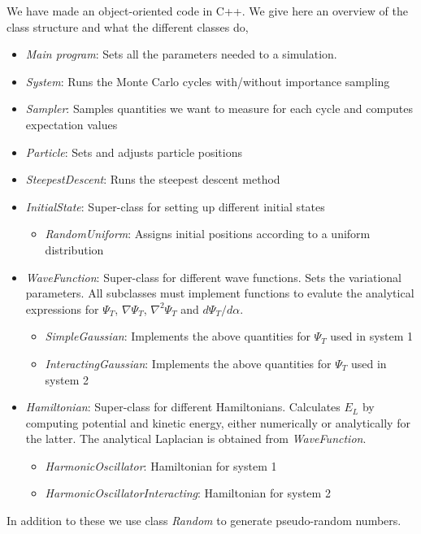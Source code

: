 \documentclass[english, a4paper]{article}
\begin{document}
We have made an object-oriented code in C++. We give here 
an overview of the class structure and what the different classes do,
\begin{itemize}
 \item \textit{Main program}: Sets all the parameters needed to a simulation. 
 \item \textit{System}: Runs the Monte Carlo cycles with/without importance sampling
 \item \textit{Sampler}: Samples quantities we want to measure for each cycle and computes expectation values
 \item \textit{Particle}: Sets and adjusts particle positions
 \item \textit{SteepestDescent}: Runs the steepest descent method
 \item \textit{InitialState}: Super-class for setting up different initial states
 \begin{itemize}
     \item \textit{RandomUniform}: Assigns initial positions according to a uniform distribution
 \end{itemize}
 \item \textit{WaveFunction}: Super-class for different wave functions. Sets the variational parameters.
       All subclasses must implement functions to evalute the analytical expressions for $\Psi_T$, 
       $\nabla \Psi_T$, $\nabla^2 \Psi_T$ and $d\Psi_T / d\alpha$.
 \begin{itemize}
     \item \textit{SimpleGaussian}: Implements the above quantities for $\Psi_T$ used in system 1
     \item \textit{InteractingGaussian}: Implements the above quantities for $\Psi_T$ used in system 2
 \end{itemize}
     \item \textit{Hamiltonian}: Super-class for different Hamiltonians. Calculates $E_L$ by computing
       potential and kinetic energy, either numerically or analytically for the latter. The analytical
       Laplacian is obtained from \textit{WaveFunction}.
  \begin{itemize}
       \item \textit{HarmonicOscillator}: Hamiltonian for system 1
       \item \textit{HarmonicOscillatorInteracting}: Hamiltonian for system 2
  \end{itemize}
\end{itemize}
In addition to these we use class \textit{Random} to generate pseudo-random numbers. \\
\end{document}
